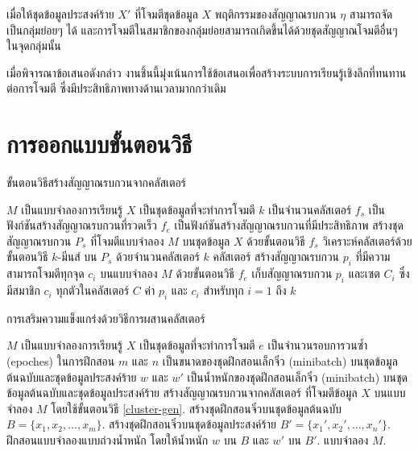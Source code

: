\documentclass{cpereport}
\begin{document}
\begin{claim}
เมื่อให้ชุดข้อมูลประสงค์ร้าย $X'$ ที่โจมตีชุดข้อมูล $X$ พฤติกรรมของสัญญาณรบกวน $\eta$ สามารถจัดเป็นกลุ่มย่อยๆ ได้ และการโจมตีในสมาชิกของกลุ่มย่อยสามารถเกิดขึ้นได้ด้วยชุดสัญญาณโจมตีอื่นๆ ในจุดกลุ่มนั้น
\end{claim}

เมื่อพิจารณาข้อเสนอดังกล่าว งานชิ้นนี้มุ่งเน้นการใช้ข้อเสนอเพื่อสร้างระบบการเรียนรู้เชิงลึกที่ทนทานต่อการโจมตี ซึ่งมีประสิทธิภาพทางด้านเวลามากกว่าเดิม

\section{การออกแบบขั้นตอนวิธี}

\begin{algorithm} 
    \caption{ขั้นตอนวิธีสร้างสัญญาณรบกวนจากคลัสเตอร์}
    \label{cluster-gen}
    \begin{algorithmic}
        \REQUIRE $M$ เป็นแบบจำลองการเรียนรู้
        \REQUIRE $X$ เป็นชุดข้อมูลที่จะทำการโจมตี
        \REQUIRE $k$ เป็นจำนวนคลัสเตอร์
        \REQUIRE $f_s$ เป็นฟังก์ชันสร้างสัญญาณรบกวนที่รวดเร็ว
        \REQUIRE $f_e$ เป็นฟังก์ชันสร้างสัญญาณรบกวนที่มีประสิทธิภาพ
        \STATE สร้างชุดสัญญาณรบกวน $P_s$ ที่โจมตีแบบจำลอง $M$ บนชุดข้อมูล $X$ ด้วยขั้นตอนวิธี $f_s$
        \STATE วิเคราะห์คลัสเตอร์ด้วยขั้นตอนวิธี $k$-มีนส์ บน $P_s$ ด้วยจำนวนคลัสเตอร์ $k$ คลัสเตอร์
            \STATE สร้างสัญญาณรบกวน $p_i$ ที่มีความสามารถโจมตีทุกจุด $c_i$ บนแบบจำลอง $M$ ด้วยขั้นตอนวิธี $f_e$
            \STATE เก็บสัญญาณรบกวน $p_i$ และเซต $C_i$ ซึ่งมีสมาชิก $c_i$ ทุกตัวในคลัสเตอร์ $C$
        \ENDFOR
        \RETURN ค่า $p_i$ และ $c_i$ สำหรับทุก $i = 1$ ถึง $k$
    \end{algorithmic}
\end{algorithm}

\begin{algorithm} 
    \caption{การเสริมความแข็งแกร่งด้วยวิธีการผสานคลัสเตอร์}
    \label{cluster-retrain}
    \begin{algorithmic}
        \REQUIRE $M$ เป็นแบบจำลองการเรียนรู้
        \REQUIRE $X$ เป็นชุดข้อมูลที่จะทำการโจมตี
        \REQUIRE $e$ เป็นจำนวนรอบการวนซ้ำ (epoches) ในการฝึกสอน
        \REQUIRE $m$ และ $n$ เป็นขนาดของชุดฝึกสอนเล็กจิ๋ว (minibatch) บนชุดข้อมูลต้นฉบับและชุดข้อมูลประสงค์ร้าย
        \REQUIRE $w$ และ $w'$ เป็นน้ำหนักของชุดฝึกสอนเล็กจิ๋ว (minibatch) บนชุดข้อมูลต้นฉบับและชุดข้อมูลประสงค์ร้าย
        \STATE สร้างสัญญาณรบกวนจากคลัสเตอร์ ที่โจมตีข้อมูล $X$ บนแบบจำลอง $M$ โดยใช้ขั้นตอนวิธี \ref{cluster-gen}.
            \STATE สร้างชุดฝึกสอนจิ๋วบนชุดข้อมูลต้นฉบับ $B=\{x_1, x_2, \dots, x_m\}$.
            \STATE สร้างชุดฝึกสอนจิ๋วบนชุดข้อมูลประสงค์ร้าย $B'=\{x_1', x_2', \dots, x_n'\}$.
            \STATE ฝึกสอนแบบจำลองแบบถ่วงน้ำหนัก โดยให้น้ำหนัก $w$ บน $B$ และ $w'$ บน $B'$.
        \ENDFOR
        \RETURN แบบจำลอง $M$.
    \end{algorithmic}
\end{algorithm}

 

\end{document}
